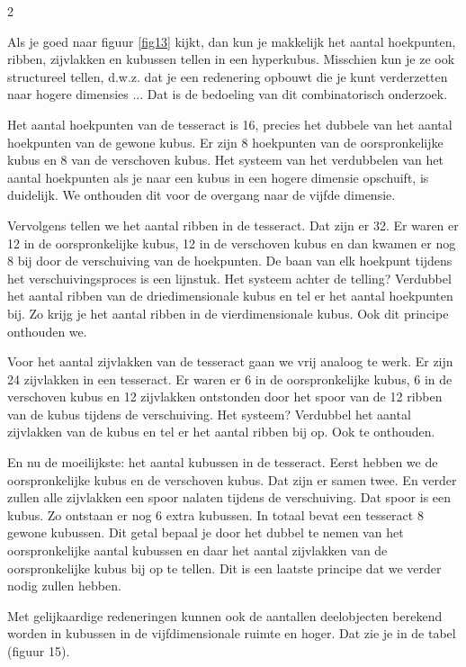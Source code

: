 \begin{multicols}{2}

Als je goed naar figuur \ref{fig13} kijkt, dan kun je makkelijk het aantal hoekpunten, ribben, zijvlakken en kubussen tellen in een hyperkubus. Misschien kun je ze ook structureel tellen, d.w.z. dat je een redenering opbouwt die je kunt verderzetten naar hogere dimensies ... Dat is de bedoeling van dit combinatorisch onderzoek.

Het aantal hoekpunten van de tesseract is 16, precies het dubbele van het aantal hoekpunten van de gewone kubus. Er zijn 8 hoekpunten van de oorspronkelijke kubus en 8 van de verschoven kubus. Het systeem van het verdubbelen van het aantal hoekpunten als je naar een kubus in een hogere dimensie opschuift, is duidelijk. We onthouden dit voor de overgang naar de vijfde dimensie.

Vervolgens tellen we het aantal ribben in de tesseract. Dat zijn er 32. Er waren er 12 in de oorspronkelijke kubus, 12 in de verschoven kubus en dan kwamen er nog 8 bij door de verschuiving van de hoekpunten. De baan van elk hoekpunt tijdens het verschuivingsproces is een lijnstuk. Het systeem achter de telling? Verdubbel het aantal ribben van de driedimensionale kubus en tel er het aantal hoekpunten bij. Zo krijg je het aantal ribben in de vierdimensionale kubus. Ook dit principe onthouden we.

Voor het aantal zijvlakken van de tesseract gaan we vrij analoog te werk. Er zijn 24 zijvlakken in een tesseract. Er waren er 6 in de oorspronkelijke kubus, 6 in de verschoven kubus en 12 zijvlakken ontstonden door het spoor van de 12 ribben van de kubus tijdens de verschuiving. Het systeem? Verdubbel het aantal zijvlakken van de kubus en tel er het aantal ribben bij op. Ook te onthouden.

En nu de moeilijkste: het aantal kubussen in de tesseract. Eerst hebben we de oorspronkelijke kubus en de verschoven kubus. Dat zijn er samen twee. En verder zullen alle zijvlakken een spoor nalaten tijdens de verschuiving. Dat spoor is een kubus. Zo ontstaan er nog 6 extra kubussen. In totaal bevat een tesseract 8 gewone kubussen. Dit getal bepaal je door het dubbel te nemen van het oorspronkelijke aantal kubussen en daar het aantal zijvlakken van de oorspronkelijke kubus bij op te tellen. Dit is een laatste principe dat we verder nodig zullen hebben.

Met gelijkaardige redeneringen kunnen ook de aantallen deelobjecten berekend worden in kubussen in de vijfdimensionale ruimte en hoger. Dat zie je in de tabel (figuur 15). 




\end{multicols}
